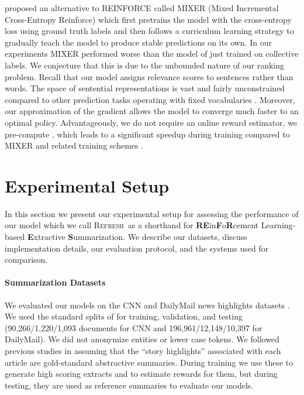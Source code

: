 \documentclass[11pt,a4paper]{article}
\newcommand\refresh{\textsc{Refresh}}
\begin{document}
 proposed an alternative to REINFORCE
called MIXER (Mixed Incremental Cross-Entropy Reinforce) which first
pretrains the model with the cross-entropy loss using ground truth
labels and then follows a curriculum learning strategy
\cite{bengio-nips2015-curriculum} to gradually teach the model to
produce stable predictions on its own. In our experiments MIXER
performed worse than the model of  just trained
on collective labels. We conjecture that this is due to the unbounded
nature of our ranking problem. Recall that our model assigns relevance
scores to sentences rather than words. The space of sentential
representations is vast and fairly unconstrained compared to other
prediction tasks operating with fixed vocabularies
\cite{li-emnlp-16,paulus-socher-arxiv17,xingxing-arxiv-17}.  Moreover,
our approximation of the gradient allows the model to converge much
faster to an optimal policy. Advantageously, we do not require an
online reward estimator, we pre-compute , which
leads to a significant speedup during training compared to MIXER
\cite{ranzato-arxiv15-bias} and related training schemes
\cite{shenMRT-acl16}.








\section{Experimental Setup}
\label{sec:experiments}

In this section we present our experimental setup for assessing the
performance of our model which we call \refresh\ as a shorthand for
\textbf{RE}in\textbf{F}o\textbf{R}cement Learning-based
\textbf{E}xtractive \textbf{S}ummarization. We describe our datasets,
discuss implementation details, our evaluation protocol, and the
systems used for comparison.

\paragraph{Summarization Datasets}

We evaluated our models on the CNN and DailyMail news highlights
datasets \cite{hermann-nips15}. We used the standard splits of
 for training, validation, and testing
(90,266/1,220/1,093 documents for CNN and 196,961/12,148/10,397 for
DailyMail).  We did not anonymize entities or lower case tokens. We
followed previous studies
\cite{jp-acl16,nallapati-signll16,nallapati17,see-acl17,tanwan-acl17}
in assuming that the ``story highlights'' associated with each article
are gold-standard abstractive summaries.  During training we use these
to generate high scoring extracts and to estimate rewards for them,
but during testing, they are used as reference summaries to evaluate
our models.
\end{document}
